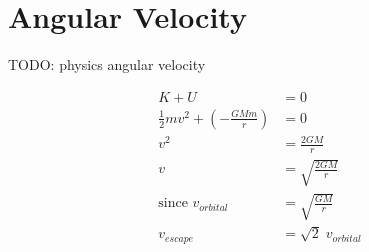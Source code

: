 \section{Angular Velocity} \label{18/11/2024} TODO: physics angular velocity

\begin{align*}
	K + U &= 0 \\
	\frac{1}{2}mv^2 + (-\frac{GMm}{r}) &= 0 \\
	v^2 &= \frac{2GM}{r} \\
	v &= \sqrt{\frac{2GM}{r}} \\
	\text{since } v_{orbital} &= \sqrt{\frac{GM}{r}} \\
	v_{escape} &= \sqrt{2}\;v_{orbital}
\end{align*}
